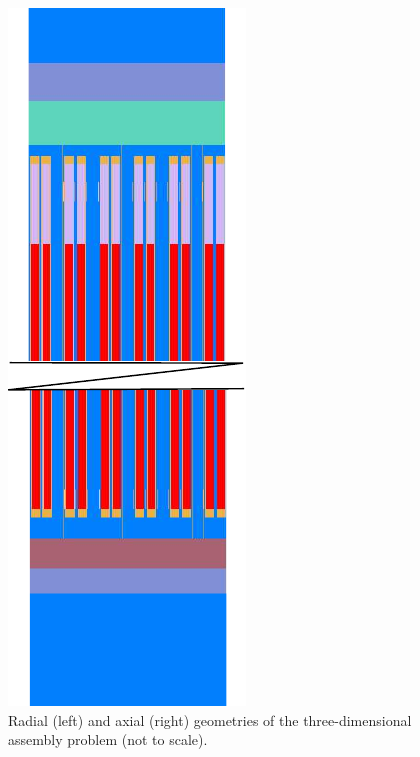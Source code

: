 \begin{figure}
\begin{minipage}{.15\textwidth}
      \includegraphics[width=\textwidth]{figs/axial.pdf}
    \end{minipage}
    \caption[Radial and axial geometries of the three-dimensional assembly problem]{Radial (left) and axial (right) geometries of the three-dimensional assembly problem (not to scale).}
    \label{fig_46}
\end{figure}

